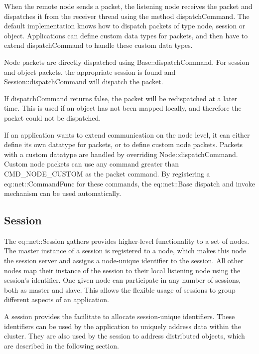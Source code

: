 \documentclass[10pt,a4]{scrartcl}
\begin{document}
When the remote node sends a packet, the listening node receives the
packet and dispatches it from the receiver thread using the method
\textsf{dispatchCommand}. The default implementation knows how to
dispatch packets of type node, session or object. Applications can
define custom data types for packets, and then have to extend
\textsf{dispatchCommand} to handle these custom data types.

Node packets are directly dispatched using
\textsf{Base::dispatchCommand}. For session and object packets, the
appropriate session is found and \textsf{Session::dispatchCommand} will
dispatch the packet.

If \textsf{dispatchCommand} returns false, the packet will be
redispatched at a later time. This is used if an object has not been
mapped locally, and therefore the packet could not be dispatched.

If an application wants to extend communication on the node level, it
can either define its own datatype for packets, or to define custom node
packets. Packets with a custom datatype are handled by overriding
\textsf{Node::dispatchCommand}. Custom node packets can use any command
greater than \textsf{CMD\_NODE\_CUSTOM} as the packet command. By
registering a \textsf{eq::net::CommandFunc} for these commands, the
\textsf{eq::net::Base} dispatch and invoke mechanism can be used
automatically.

\subsection{Session}

The \textsf{eq::net::Session} gathers provides higher-level
functionality to a set of nodes. The master instance of a session is
registered to a node, which makes this node the session server and
assigns a node-unique identifier to the session. All other nodes map
their instance of the session to their local listening node using the
session's identifier. One given node can participate in any number of
sessions, both as master and slave. This allows the flexible usage of
sessions to group different aspects of an application.

A session provides the facilitate to allocate session-unique
identifiers. These identifiers can be used by the application to
uniquely address data within the cluster. They are also used by the
session to address distributed objects, which are described in the
following section.
\end{document}
